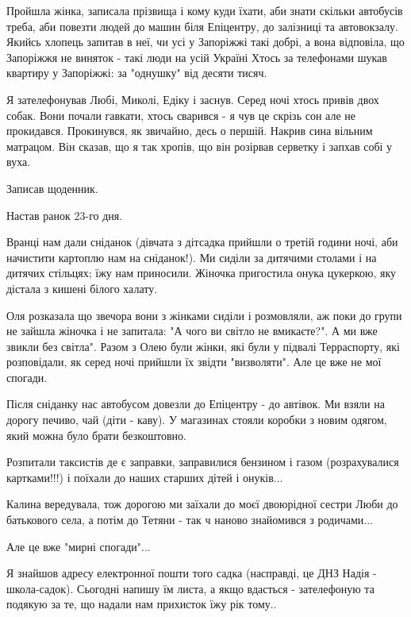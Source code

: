 Пройшла жінка, записала прізвища і кому куди їхати, аби знати скільки автобусів
треба, аби повезти людей до машин біля Епіцентру, до залізниці та автовокзалу.
Якийсь хлопець запитав в неї, чи усі у Запоріжжі такі добрі, а вона відповіла,
що Запоріжжя не виняток - такі люди на усій Україні  Хтось за телефонами шукав
квартиру у Запоріжжі: за "однушку" від десяти тисяч. 

Я зателефонував Любі, Миколі, Едіку і заснув. Серед ночі хтось привів двох
собак. Вони почали гавкати, хтось сварився - я чув це скрізь сон але не
прокидався. Прокинувся, як звичайно, десь о першій. Накрив сина вільним
матрацом. Він сказав, що я так хропів, що він розірвав серветку і запхав собі у
вуха. 

Записав щоденник.

Настав ранок 23-го дня.

Вранці нам дали сніданок (дівчата з дітсадка прийшли о третій години ночі, аби
начистити картоплю нам на сніданок!). Ми сиділи за дитячими столами і на
дитячих стільцях; їжу нам приносили. Жіночка пригостила онука цукеркою, яку
дістала з кишені білого халату. 

Оля розказала що звечора вони з жінками сиділи і розмовляли, аж поки до групи
не зайшла жіночка і не запитала: "А чого ви світло не вмикаєте?". А ми  вже
звикли без світла". Разом з Олею були жінки, які були у підвалі Терраспорту,
які розповідали, як серед ночі прийшли їх звідти "визволяти". Але це вже не мої
спогади.  

Після сніданку нас автобусом довезли до Епіцентру - до автівок. Ми взяли на
дорогу печиво, чай (діти - каву). У магазинах стояли коробки з новим одягом,
який можна було брати безкоштовно.  

Розпитали таксистів де є заправки, заправилися бензином і газом (розрахувалися
картками!!!) і поїхали до наших старших дітей і онуків... 

Калина вередувала, тож дорогою ми заїхали до моєї двоюрідної сестри Люби до
батькового села, а потім до Тетяни - так ч наново знайомився з родичами...

Але це вже "мирні спогади"...

Я знайшов адресу електронної пошти того садка (насправді, це ДНЗ Надія -
школа-садок). Сьогодні напишу їм листа, а якщо вдасться - зателефоную та
подякую за те, що надали нам прихисток їжу рік тому..

